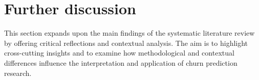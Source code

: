 \documentclass[preprint,12pt]{elsarticle}
\begin{document}

\section{Further discussion}
\label{sec:discussion}

This section expands upon the main findings of the systematic literature review by offering critical reflections and contextual analysis. The aim is to highlight cross-cutting insights and to examine how methodological and contextual differences influence the interpretation and application of churn prediction research.
\end{document}
